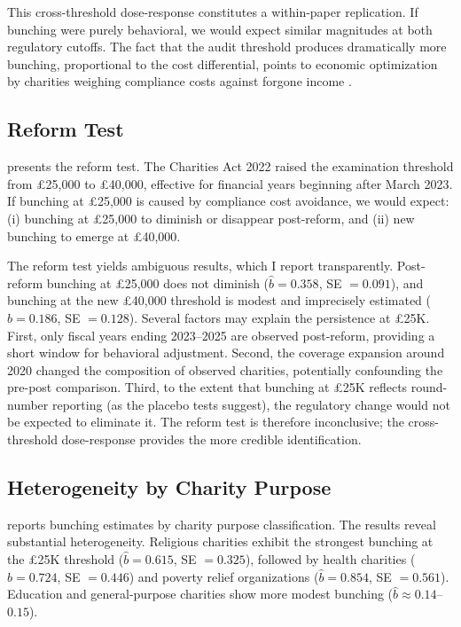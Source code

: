\documentclass[12pt]{article}
\begin{document}
This cross-threshold dose-response constitutes a within-paper replication. If bunching were purely behavioral, we would expect similar magnitudes at both regulatory cutoffs. The fact that the audit threshold produces dramatically more bunching, proportional to the cost differential, points to economic optimization by charities weighing compliance costs against forgone income \citep{kleven2016bunching}.



\subsection{Reform Test}

 presents the reform test. The Charities Act 2022 raised the examination threshold from \pounds25,000 to \pounds40,000, effective for financial years beginning after March 2023. If bunching at \pounds25,000 is caused by compliance cost avoidance, we would expect: (i) bunching at \pounds25,000 to diminish or disappear post-reform, and (ii) new bunching to emerge at \pounds40,000.

The reform test yields ambiguous results, which I report transparently. Post-reform bunching at \pounds25,000 does not diminish ($\hat{b} = 0.358$, SE $= 0.091$), and bunching at the new \pounds40,000 threshold is modest and imprecisely estimated ($\hat{b} = 0.186$, SE $= 0.128$). Several factors may explain the persistence at \pounds25K. First, only fiscal years ending 2023--2025 are observed post-reform, providing a short window for behavioral adjustment. Second, the coverage expansion around 2020 changed the composition of observed charities, potentially confounding the pre-post comparison. Third, to the extent that bunching at \pounds25K reflects round-number reporting (as the placebo tests suggest), the regulatory change would not be expected to eliminate it. The reform test is therefore inconclusive; the cross-threshold dose-response provides the more credible identification.



\subsection{Heterogeneity by Charity Purpose}

 reports bunching estimates by charity purpose classification. The results reveal substantial heterogeneity. Religious charities exhibit the strongest bunching at the \pounds25K threshold ($\hat{b} = 0.615$, SE $= 0.325$), followed by health charities ($\hat{b} = 0.724$, SE $= 0.446$) and poverty relief organizations ($\hat{b} = 0.854$, SE $= 0.561$). Education and general-purpose charities show more modest bunching ($\hat{b} \approx 0.14$--$0.15$).
\end{document}
